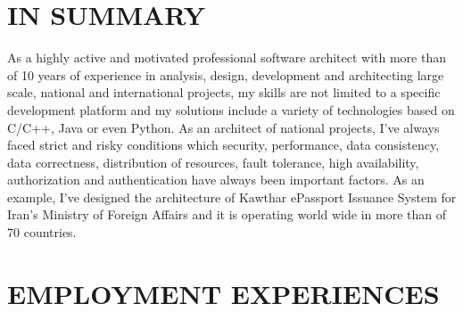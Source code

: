 \documentclass[10pt,a4paper]{article}
\begin{document}
\thispagestyle{fancy}

\section{IN SUMMARY}
As a highly active and motivated professional software architect with more than of 10 years of experience in analysis, design, development and architecting large scale, national and international projects, my skills are not limited to a specific development platform and my solutions include a variety of technologies based on C/C++, Java or even Python. As an architect of national projects, I've always faced strict and risky conditions which security, performance, data consistency, data correctness, distribution of resources, fault tolerance, high availability, authorization and authentication have always been important factors. As an example, I've designed the architecture of Kawthar ePassport Issuance System for Iran's Ministry of Foreign Affairs and it is operating world wide in more than of 70 countries.


\section{EMPLOYMENT EXPERIENCES}
\end{document}
